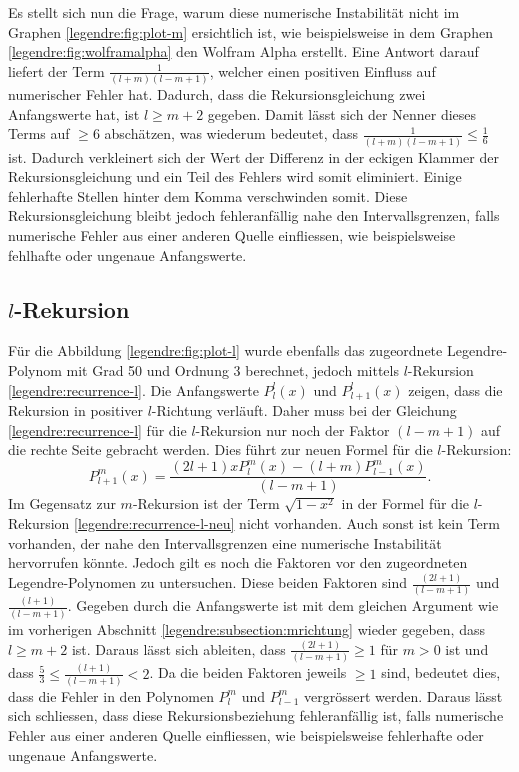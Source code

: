 Es stellt sich nun die Frage, warum diese numerische Instabilität nicht im Graphen \ref{legendre:fig:plot-m} ersichtlich ist, wie beispielsweise in dem Graphen \ref{legendre:fig:wolframalpha} den Wolfram Alpha erstellt.
Eine Antwort darauf liefert der Term $\frac{1}{(l+m)(l-m+1)}$, welcher einen positiven Einfluss auf numerischer Fehler hat.
Dadurch, dass die Rekursionsgleichung zwei Anfangswerte hat, ist $l\geq m+2$ gegeben.
Damit lässt sich der Nenner dieses Terms auf $\geq 6$ abschätzen, was wiederum bedeutet, dass $\frac{1}{(l+m)(l-m+1)} \leq \frac{1}{6}$ ist.
Dadurch verkleinert sich der Wert der Differenz in der eckigen Klammer der Rekursionsgleichung und ein Teil des Fehlers wird somit eliminiert.
Einige fehlerhafte Stellen hinter dem Komma verschwinden somit.
Diese Rekursionsgleichung bleibt jedoch fehleranfällig nahe den Intervallsgrenzen, falls numerische Fehler aus einer anderen Quelle einfliessen, wie beispielsweise fehlhafte oder ungenaue Anfangswerte.

\subsection{$l$-Rekursion
\label{legendre:subsection:lrichtung}}
Für die Abbildung \ref{legendre:fig:plot-l} wurde ebenfalls das zugeordnete Legendre-Polynom mit Grad 50 und Ordnung 3 berechnet, jedoch mittels $l$-Rekursion \eqref{legendre:recurrence-l}.
Die Anfangswerte $P^{l}_{l}(x)$ und $P^{l}_{l+1}(x)$ zeigen, dass die Rekursion in positiver $l$-Richtung verläuft.
Daher muss bei der Gleichung \eqref{legendre:recurrence-l} für die $l$-Rekursion nur noch der Faktor $(l-m+1)$ auf die rechte Seite gebracht werden.
Dies führt zur neuen Formel für die $l$-Rekursion: 
\begin{equation}
P^{m}_{l+1}(x)
= \frac{(2l+1)xP^{m}_{l}(x)-(l+m)P^{m}_{l-1}(x)}{(l-m+1)} .
\label{legendre:recurrence-l-neu}
\end{equation}
Im Gegensatz zur $m$-Rekursion ist der Term $\sqrt{1-x^2}$ in der Formel für die $l$-Rekursion \eqref{legendre:recurrence-l-neu} nicht vorhanden.
Auch sonst ist kein Term vorhanden, der nahe den Intervallsgrenzen eine numerische Instabilität hervorrufen könnte.
Jedoch gilt es noch die Faktoren vor den zugeordneten Legendre-Polynomen zu untersuchen.
Diese beiden Faktoren sind $\frac{(2l+1)}{(l-m+1)}$ und $\frac{(l+1)}{(l-m+1)}$.
Gegeben durch die Anfangswerte ist mit dem gleichen Argument wie im vorherigen Abschnitt \ref{legendre:subsection:mrichtung} wieder gegeben, dass $l\geq m+2$ ist.
Daraus lässt sich ableiten, dass $\frac{(2l+1)}{(l-m+1)}\geq 1$ für $m>0$ ist und dass $\frac{5}{3}\leq \frac{(l+1)}{(l-m+1)}<2$.
Da die beiden Faktoren jeweils $\geq 1$ sind, bedeutet dies, dass die Fehler in den Polynomen $P^{m}_{l}$ und $P^{m}_{l-1}$ vergrössert werden.
Daraus lässt sich schliessen, dass diese Rekursionsbeziehung fehleranfällig ist, falls numerische Fehler aus einer anderen Quelle einfliessen, wie beispielsweise fehlerhafte oder ungenaue Anfangswerte.

